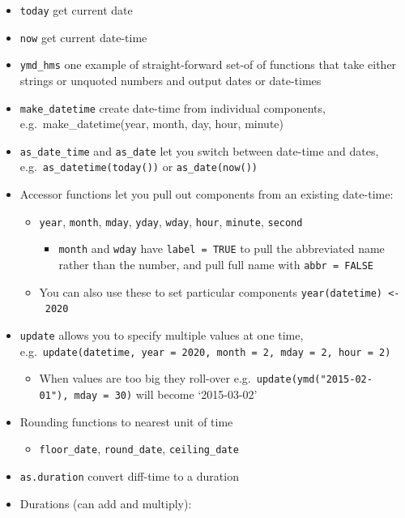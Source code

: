 \documentclass[]{book}
\providecommand{\tightlist}{%
  \setlength{\itemsep}{0pt}\setlength{\parskip}{0pt}}
\theoremstyle{definition}
\theoremstyle{definition}
\theoremstyle{definition}
\theoremstyle{remark}
\begin{document}
\begin{itemize}
\tightlist
\item
  \texttt{today} get current date
\item
  \texttt{now} get current date-time
\item
  \texttt{ymd\_hms} one example of straight-forward set-of of functions
  that take either strings or unquoted numbers and output dates or
  date-times
\item
  \texttt{make\_datetime} create date-time from individual components,
  e.g.~make\_datetime(year, month, day, hour, minute)
\item
  \texttt{as\_date\_time} and \texttt{as\_date} let you switch between
  date-time and dates, e.g.~\texttt{as\_datetime(today())} or
  \texttt{as\_date(now())}
\item
  Accessor functions let you pull out components from an existing
  date-time:

  \begin{itemize}
  \tightlist
  \item
    \texttt{year}, \texttt{month}, \texttt{mday}, \texttt{yday},
    \texttt{wday}, \texttt{hour}, \texttt{minute}, \texttt{second}

    \begin{itemize}
    \tightlist
    \item
      \texttt{month} and \texttt{wday} have \texttt{label\ =\ TRUE} to
      pull the abbreviated name rather than the number, and pull full
      name with \texttt{abbr\ =\ FALSE}
    \end{itemize}
  \item
    You can also use these to set particular components
    \texttt{year(datetime)\ \textless{}-\ 2020}
  \end{itemize}
\item
  \texttt{update} allows you to specify multiple values at one time,
  e.g.~\texttt{update(datetime,\ year\ =\ 2020,\ month\ =\ 2,\ mday\ =\ 2,\ hour\ =\ 2)}

  \begin{itemize}
  \tightlist
  \item
    When values are too big they roll-over
    e.g.~\texttt{update(ymd("2015-02-01"),\ mday\ =\ 30)} will become
    `2015-03-02'
  \end{itemize}
\item
  Rounding functions to nearest unit of time

  \begin{itemize}
  \tightlist
  \item
    \texttt{floor\_date}, \texttt{round\_date}, \texttt{ceiling\_date}
  \end{itemize}
\item
  \texttt{as.duration} convert diff-time to a duration
\item
  Durations (can add and multiply):


\end{itemize}
\end{document}
